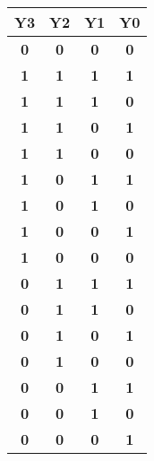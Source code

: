 \begin{table}[htb]
\begin{tabular}{|c|c|c|c|}
\textbf{Y3} & \textbf{Y2} & \textbf{Y1} & \textbf{Y0} \\ \hline  
\textbf{0}  & \textbf{0}  & \textbf{0}  & \textbf{0}  \\ \hline  
\textbf{1}  & \textbf{1}  & \textbf{1}  & \textbf{1}  \\ \hline  
\textbf{1}  & \textbf{1}  & \textbf{1}  & \textbf{0}  \\ \hline  
\textbf{1}  & \textbf{1}  & \textbf{0}  & \textbf{1}  \\ \hline  
\textbf{1}  & \textbf{1}  & \textbf{0}  & \textbf{0}  \\ \hline  
\textbf{1}  & \textbf{0}  & \textbf{1}  & \textbf{1}  \\ \hline  
\textbf{1}  & \textbf{0}  & \textbf{1}  & \textbf{0}  \\ \hline  
\textbf{1}  & \textbf{0}  & \textbf{0}  & \textbf{1}  \\ \hline  
\textbf{1}  & \textbf{0}  & \textbf{0}  & \textbf{0}  \\ \hline  
\textbf{0}  & \textbf{1}  & \textbf{1}  & \textbf{1}  \\ \hline  
\textbf{0}  & \textbf{1}  & \textbf{1}  & \textbf{0}  \\ \hline  
\textbf{0}  & \textbf{1}  & \textbf{0}  & \textbf{1}  \\ \hline  
\textbf{0}  & \textbf{1}  & \textbf{0}  & \textbf{0}  \\ \hline  
\textbf{0}  & \textbf{0}  & \textbf{1}  & \textbf{1}  \\ \hline  
\textbf{0}  & \textbf{0}  & \textbf{1}  & \textbf{0}  \\ \hline  
\textbf{0}  & \textbf{0}  & \textbf{0}  & \textbf{1}  \\ \hline  
\end{tabular} 
\end{table}

